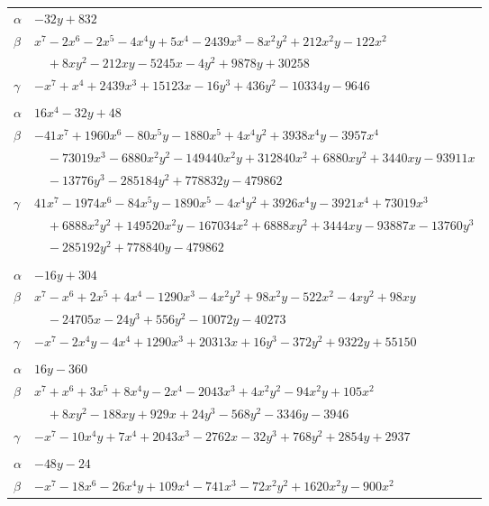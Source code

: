 \documentclass[11pt]{article}
\begin{document}
\begin{longtable}{@{}ll@{}}
$\alpha$ & $-32y+832$\\
$\beta$ & $x^{7}-2x^{6}-2x^{5}-4x^{4}y+5x^{4}-2439x^{3}-8x^{2}y^{2}+212x^{2}y-122x^{2}$\\
 & $\quad +8xy^{2}-212xy-5245x-4y^{2}+9878y+30258$\\
$\gamma$ & $-x^{7}+x^{4}+2439x^{3}+15123x-16y^{3}+436y^{2}-10334y-9646$\\
\addlinespace[3pt]
\multicolumn{2}{@{}l}{$\{i,j\}=\{94,101\}$, $k_{ij}=2^{4}\cdot 3$}\\
$\alpha$ & $16x^{4}-32y+48$\\
$\beta$ & $-41x^{7}+1960x^{6}-80x^{5}y-1880x^{5}+4x^{4}y^{2}+3938x^{4}y-3957x^{4}$\\
 & $\quad -73019x^{3}-6880x^{2}y^{2}-149440x^{2}y+312840x^{2}+6880xy^{2}+3440xy-93911x$\\
 & $\quad -13776y^{3}-285184y^{2}+778832y-479862$\\
$\gamma$ & $41x^{7}-1974x^{6}-84x^{5}y-1890x^{5}-4x^{4}y^{2}+3926x^{4}y-3921x^{4}+73019x^{3}$\\
 & $\quad +6888x^{2}y^{2}+149520x^{2}y-167034x^{2}+6888xy^{2}+3444xy-93887x-13760y^{3}$\\
 & $\quad -285192y^{2}+778840y-479862$\\
\addlinespace[3pt]
\multicolumn{2}{@{}l}{$\{i,j\}=\{97,98\}$, $k_{ij}=2^{6}\cdot 5^{3}\cdot 17$}\\
$\alpha$ & $-16y+304$\\
$\beta$ & $x^{7}-x^{6}+2x^{5}+4x^{4}-1290x^{3}-4x^{2}y^{2}+98x^{2}y-522x^{2}-4xy^{2}+98xy$\\
 & $\quad -24705x-24y^{3}+556y^{2}-10072y-40273$\\
$\gamma$ & $-x^{7}-2x^{4}y-4x^{4}+1290x^{3}+20313x+16y^{3}-372y^{2}+9322y+55150$\\
\addlinespace[3pt]
\multicolumn{2}{@{}l}{$\{i,j\}=\{100,102\}$, $k_{ij}=2^{5}\cdot 7^{2}$}\\
$\alpha$ & $16y-360$\\
$\beta$ & $x^{7}+x^{6}+3x^{5}+8x^{4}y-2x^{4}-2043x^{3}+4x^{2}y^{2}-94x^{2}y+105x^{2}$\\
 & $\quad +8xy^{2}-188xy+929x+24y^{3}-568y^{2}-3346y-3946$\\
$\gamma$ & $-x^{7}-10x^{4}y+7x^{4}+2043x^{3}-2762x-32y^{3}+768y^{2}+2854y+2937$\\
\addlinespace[3pt]
\multicolumn{2}{@{}l}{$\{i,j\}=\{102,105\}$, $k_{ij}=2^{4}\cdot 3^{2}$}\\
$\alpha$ & $-48y-24$\\
$\beta$ & $-x^{7}-18x^{6}-26x^{4}y+109x^{4}-741x^{3}-72x^{2}y^{2}+1620x^{2}y-900x^{2}$\\

\end{longtable}
\end{document}
